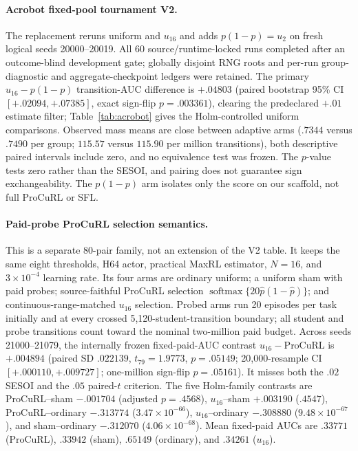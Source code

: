 \paragraph{Acrobot fixed-pool tournament V2.}
The replacement reruns uniform and $u_{16}$ and adds $p(1-p)=u_2$ on fresh
logical seeds 20000--20019. All 60 source/runtime-locked runs completed after
an outcome-blind development gate; globally disjoint RNG roots and per-run
group-diagnostic and aggregate-checkpoint ledgers were retained. The primary
$u_{16}-p(1-p)$ transition-AUC difference is $+.04803$ (paired bootstrap 95\%
CI $[+.02094,+.07385]$, exact sign-flip $p=.003361$), clearing the
predeclared $+.01$ estimate filter; Table~\ref{tab:acrobot} gives the
Holm-controlled uniform comparisons. Observed mass means are close between
adaptive arms ($.7344$ versus $.7490$ per group; $115.57$ versus $115.90$
per million transitions), both descriptive paired intervals include zero,
and no equivalence test was frozen. The $p$-value tests zero rather than the
SESOI, and pairing does not guarantee sign exchangeability. The $p(1-p)$ arm
isolates only the score on our scaffold, not full ProCuRL or SFL.

\paragraph{Paid-probe ProCuRL selection semantics.}
This is a separate 80-pair family, not an extension of the V2 table. It keeps
the same eight thresholds, H64 actor, practical MaxRL estimator, $N=16$, and
$3\times10^{-4}$ learning rate. Its four arms are ordinary uniform; a uniform
sham with paid probes; source-faithful ProCuRL selection
$\operatorname{softmax}\{20\hat p(1-\hat p)\}$; and continuous-range-matched
$u_{16}$ selection. Probed arms run 20 episodes per task initially and at every
crossed 5,120-student-transition boundary; all student and probe transitions
count toward the nominal two-million paid budget. Across seeds 21000--21079,
the internally frozen fixed-paid-AUC contrast $u_{16}-$ProCuRL is
$+.004894$ (paired SD $.022139$, $t_{79}=1.9773$, $p=.05149$; 20,000-resample
CI $[+.000110,+.009727]$; one-million sign-flip $p=.05161$). It misses both
the $.02$ SESOI and the $.05$ paired-$t$ criterion. The five Holm-family
contrasts are ProCuRL--sham $-.001704$ (adjusted $p=.4568$),
$u_{16}$--sham $+.003190$ ($.4547$), ProCuRL--ordinary $-.313774$
($3.47\times10^{-66}$), $u_{16}$--ordinary $-.308880$
($9.48\times10^{-67}$), and sham--ordinary $-.312070$
($4.06\times10^{-68}$). Mean fixed-paid AUCs are $.33771$ (ProCuRL),
$.33942$ (sham), $.65149$ (ordinary), and $.34261$ ($u_{16}$).

